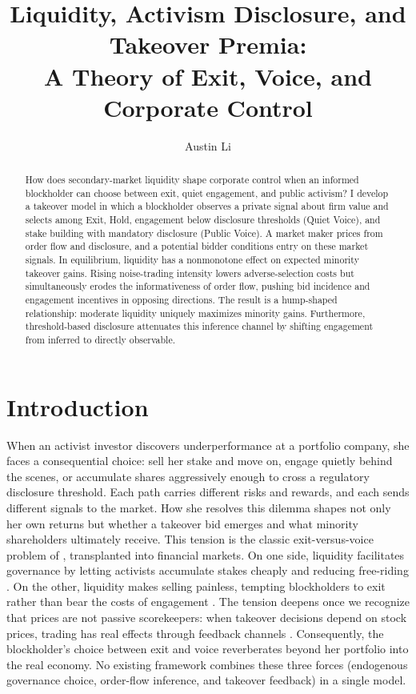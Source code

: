 \documentclass[11pt]{article}
\title{\textbf{Liquidity, Activism Disclosure, and Takeover Premia:}\\[0.3em]
\large A Theory of Exit, Voice, and Corporate Control}
\author{Austin Li\\[0.25em]}
\date{}
\newcommand{\1}{\mathbf{1}}
\begin{document}
\maketitle

\begin{abstract}
\noindent How does secondary-market liquidity shape corporate control when an informed blockholder can choose between exit, quiet engagement, and public activism? I develop a takeover model in which a blockholder observes a private signal about firm value and selects among Exit, Hold, engagement below disclosure thresholds (Quiet Voice), and stake building with mandatory disclosure (Public Voice). A market maker prices from order flow and disclosure, and a potential bidder conditions entry on these market signals. In equilibrium, liquidity has a nonmonotone effect on expected minority takeover gains. Rising noise-trading intensity lowers adverse-selection costs but simultaneously erodes the informativeness of order flow, pushing bid incidence and engagement incentives in opposing directions. The result is a hump-shaped relationship: moderate liquidity uniquely maximizes minority gains. Furthermore, threshold-based disclosure attenuates this inference channel by shifting engagement from inferred to directly observable.
\end{abstract}

\newpage

\section{Introduction}

When an activist investor discovers underperformance at a portfolio company, she faces a consequential choice: sell her stake and move on, engage quietly behind the scenes, or accumulate shares aggressively enough to cross a regulatory disclosure threshold. Each path carries different risks and rewards, and each sends different signals to the market. How she resolves this dilemma shapes not only her own returns but whether a takeover bid emerges and what minority shareholders ultimately receive. This tension is the classic exit-versus-voice problem of \citet{Hirschman1970}, transplanted into financial markets. On one side, liquidity facilitates governance by letting activists accumulate stakes cheaply and reducing free-riding \citep{Maug1998}. On the other, liquidity makes selling painless, tempting blockholders to exit rather than bear the costs of engagement \citep{Coffee1991,Bhide1993}. The tension deepens once we recognize that prices are not passive scorekeepers: when takeover decisions depend on stock prices, trading has real effects through feedback channels \citep{BondEdmansGoldstein2012,EdmansGoldsteinJiang2012}. Consequently, the blockholder's choice between exit and voice reverberates beyond her portfolio into the real economy. No existing framework combines these three forces (endogenous governance choice, order-flow inference, and takeover feedback) in a single model.
\end{document}
